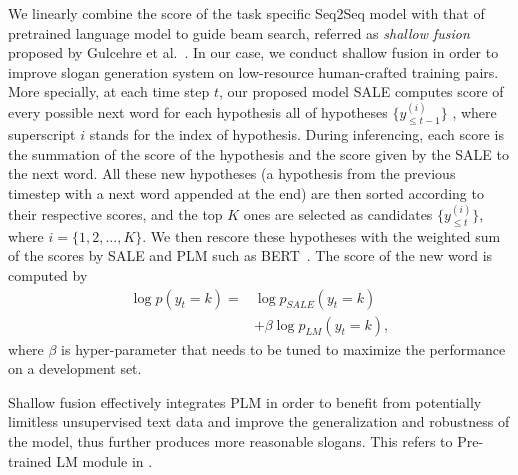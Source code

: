 We linearly combine the score of the
task specific Seq2Seq model with that of pretrained language model
to guide beam search, referred as \emph{shallow fusion} proposed by
Gulcehre et al.~\cite{gulcehre2015using}.
In our case, we conduct shallow fusion in order to improve slogan generation system
on low-resource human-crafted training pairs. 
More specially, 
at each time step $t$,
our proposed model SALE computes score of every
possible next word for each hypothesis all of hypotheses $\{y^{(i)}_{\le t-1}\}$
, where superscript $i$ stands for the index of hypothesis.
During inferencing, 
each score is the summation of the score of the hypothesis and
the score given by the SALE to the next word.
All these new hypotheses (a hypothesis from the previous timestep with 
a next word appended at the end) are then sorted according to their
respective scores, and the top $K$ ones are selected as candidates
$\{y^{(i)}_{\le t}\}$, where $i = \{1, 2, ..., K\}$.
We then rescore these hypotheses with the weighted sum of the scores
by SALE and PLM such as BERT~\cite{devlin2018bert}.
The score of the new word is computed by
\begin{equation}
\label{eq:shallow_fusion}
\begin{split}
\log p \left( y _ { t } = k \right)  =
	&	\log p_{SALE} \left( y_t = k \right) \\ 
	& + \beta \log p_{LM} \left(y_t = k\right),
\end{split}
\end{equation}
where $\beta$ is hyper-parameter that needs to be tuned to maximize the 
performance on a development set.

Shallow fusion effectively integrates PLM 
 in order to benefit 
from potentially limitless unsupervised text data and improve
the generalization and robustness of the model, 
thus further produces more reasonable slogans.
This refers to Pre-trained LM module in .



